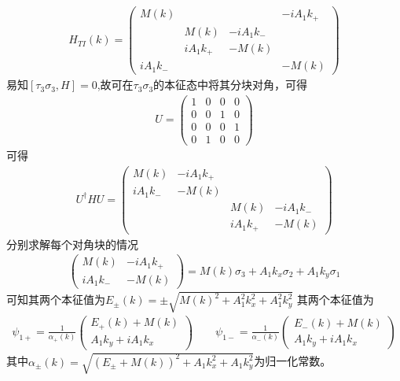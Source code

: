 \documentclass[22pt]{article}
\begin{document}
	\begin{align}
		H_{TI}(k)=
		\begin{pmatrix}
			M(k) & && -iA_1k_{+}\\
			&M(k) &-iA_1k_{-} &\\
			&iA_1k_{+} &-M(k) &\\
			iA_1k_{-} & & &-M(k)
		\end{pmatrix}
	\end{align}
	易知$[\tau_3\sigma_3,H]=0$,故可在$\tau_3\sigma_3$的本征态中将其分块对角，可得
	\begin{align}
		U=
		\begin{pmatrix}
			1 &0&0&0\\
			0&0&1&0\\
			0&0&0&1\\
			0&1&0&0
		\end{pmatrix}
	\end{align}
	可得
	\begin{align}
		U^{\dagger}HU=
		\begin{pmatrix}
			M(k) & -iA_1k_{+} &&\\
			iA_1k_{-}&-M(k) &&\\
			&&M(k) &-iA_1k_{-}\\
			&&iA_1k_{+}&-M(k)
		\end{pmatrix}
	\end{align}
	分别求解每个对角块的情况
	\begin{align}
		\begin{pmatrix}
			M(k) &-iA_1k_{+}\\
			iA_1k_{-} &-M(k)
		\end{pmatrix}
		=M(k)\sigma_3+A_1k_x\sigma_2+A_1k_y\sigma_1
	\end{align}
	可知其两个本征值为$E_{\pm}(k)=\pm\sqrt{M(k)^2+A_1^2k_x^2+A_1^2k_y^2}$
	其两个本征值为
	\begin{align}
		\psi_{1+}=\frac{1}{\alpha_{+}(k)}
		\begin{pmatrix}
			E_{+}(k)+M(k)\\
			A_1k_y+iA_1k_x
		\end{pmatrix}
		\qquad
		\psi_{1-}=\frac{1}{\alpha_{-}(k)}
		\begin{pmatrix}
			E_{-}(k)+M(k)\\
			A_1k_y+iA_1k_x
		\end{pmatrix}
	\end{align}
	其中$\alpha_{\pm}(k)=\sqrt{(E_{\pm}+M(k))^2+A_1k_x^2+A_1k_y^2}$为归一化常数。
	
\end{document}
